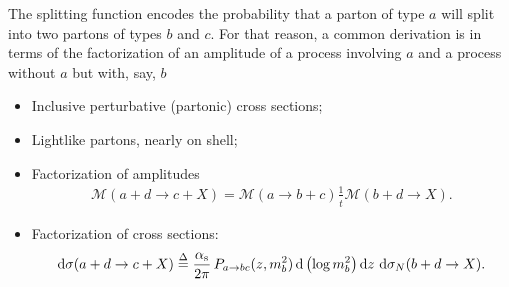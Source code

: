 \begin{subappendices}
The splitting function encodes the probability that a parton of type \(a\) will split into two partons of types \(b\) and \(c\).
%
For that reason, a common derivation is in terms of the factorization of an amplitude of a process involving \(a\) and a process without \(a\) but with, say, \(b\) 


\begin{itemize}
    \item
    Inclusive perturbative (partonic) cross sections;

    \item
    Lightlike partons, nearly on shell;

    \item
    Factorization of amplitudes
    \begin{align}
        \mathcal{M}(a + d \to c + X)
        =
        \mathcal{M}(a \to b + c)
        \frac{1}{\hat{t}}
        \mathcal{M}(b + d \to X)
        \label{eq:factorized_matrix_element}
        .
    \end{align}

    \item
    Factorization of cross sections:
    \begin{align}
        \dd \sigma(a + d \to c + X)
        \eqdelta
        \frac{\alphas}{2\pi}
        \,
        P_{a\to bc}(z, m_b^2)
        \,
        \dd\le(\log m_b^2 \ri)
        \dd z
        \,\,
        \dd \sigma_N(b + d \to X)
        \label{eq:factorized_cross_section}
        .
    \end{align}
\end{itemize}

\begin{figure}[h!]
    \centering
    \subfloat[]{
        \label{fig:splitfn_full_amplitude}
    }
    \subfloat[]{
        \label{fig:splitfn_sub_amplitude}
    }

    \caption{
    }

    \label{fig:label}
\end{figure}


\end{subappendices}
